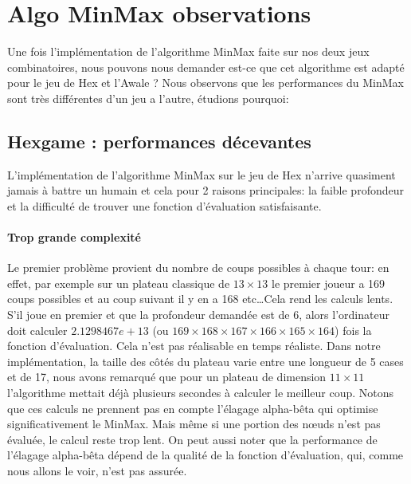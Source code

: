 




\section{Algo MinMax observations}
Une fois l'implémentation de l'algorithme MinMax faite sur nos deux
jeux combinatoires, nous pouvons nous demander est-ce que cet algorithme est adapté pour le jeu de Hex et l'Awale ?
Nous observons que les performances du MinMax sont très différentes d'un jeu a l'autre, étudions pourquoi:

\subsection {Hexgame : performances décevantes}
L'implémentation de l'algorithme MinMax sur le jeu de Hex n'arrive quasiment jamais à battre un humain et cela pour 
2 raisons principales: la faible profondeur et la difficulté de trouver une fonction d'évaluation satisfaisante.

\paragraph {Trop grande complexité} Le premier problème provient du nombre de coups possibles à chaque tour: 
en effet, par exemple sur un plateau classique de $13\times13$ le premier joueur a 169 coups possibles et au coup suivant
il y en a 168 etc\dots Cela rend les calculs lents. S'il joue en premier 
et que la profondeur demandée est de 6, alors l'ordinateur doit calculer $2.1298467e+13$ (ou $169\times168\times167\times166\times165\times164$) 
fois la fonction d'évaluation. Cela n'est pas réalisable en temps réaliste. Dans notre implémentation, la taille des côtés du plateau varie entre  
une longueur de 5 cases et de 17, nous avons remarqué que pour un plateau de dimension $11\times11$ l'algorithme mettait déjà 
plusieurs secondes à calculer le meilleur coup. Notons que ces calculs ne prennent pas en compte l'élagage alpha-bêta
qui optimise significativement le MinMax. Mais même si une portion des nœuds n'est pas évaluée, le calcul reste trop lent.
On peut aussi noter que la performance de l'élagage alpha-bêta dépend de la qualité de la fonction d'évaluation, qui, comme nous allons
le voir, n'est pas assurée.


